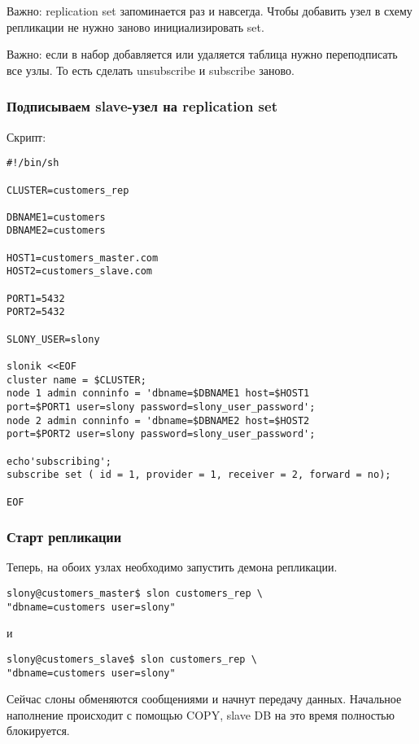 Важно: replication set запоминается раз и навсегда. Чтобы добавить узел в схему репликации не нужно заново инициализировать set.

Важно: если в набор добавляется или удаляется таблица нужно переподписать все узлы. 
То есть сделать unsubscribe и subscribe заново. 

\subsubsection{Подписываем slave-узел на replication set}
Скрипт:
\begin{lstlisting}[label=lst:slony10,caption=Подписываем slave-узел на replication set]
#!/bin/sh

CLUSTER=customers_rep

DBNAME1=customers
DBNAME2=customers

HOST1=customers_master.com
HOST2=customers_slave.com

PORT1=5432
PORT2=5432

SLONY_USER=slony

slonik <<EOF
cluster name = $CLUSTER;
node 1 admin conninfo = 'dbname=$DBNAME1 host=$HOST1 
port=$PORT1 user=slony password=slony_user_password';
node 2 admin conninfo = 'dbname=$DBNAME2 host=$HOST2 
port=$PORT2 user=slony password=slony_user_password';

echo'subscribing';
subscribe set ( id = 1, provider = 1, receiver = 2, forward = no);

EOF
\end{lstlisting}

\subsubsection{Старт репликации}
Теперь, на обоих узлах необходимо запустить демона репликации.
\begin{lstlisting}[label=lst:slony11,caption=Старт репликации]
slony@customers_master$ slon customers_rep \
"dbname=customers user=slony"
\end{lstlisting}

и
\begin{lstlisting}[label=lst:slony12,caption=Старт репликации]
slony@customers_slave$ slon customers_rep \
"dbname=customers user=slony"
\end{lstlisting}

Сейчас слоны обменяются сообщениями и начнут передачу данных. Начальное наполнение происходит с помощью COPY, 
slave DB на это время полностью блокируется.

